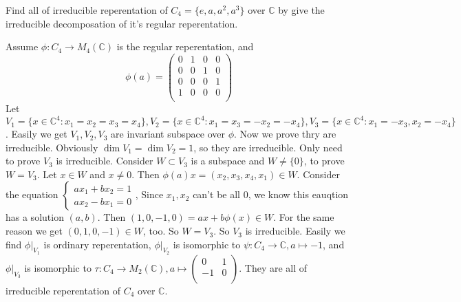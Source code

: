 \documentclass{ctexart}
\newif\ifpreface
\begin{document}
\large
\setlength{\baselineskip}{1.2em}
\ifpreface
    
\newgeometry{left=2cm,right=2cm,top=2cm,bottom=2cm}
\else
{}
\maketitle
\fi
\begin{problem}
  Find all of irreducible reperentation of \(C_4=\{e,a,a^2,a^3\}\) over \(\mathbb{C}\) by give the irreducible decomposation of it's regular reperentation. 
\end{problem}

\begin{solution}
  Assume \(\phi:C_4 \to M_4(\mathbb{C})\) is the regular reperentation, and
  \[
    \phi(a)=\left(\begin{array}{cccc}
      0 & 1 & 0 & 0 \\
      0 & 0 & 1 & 0 \\
      0 & 0 & 0 & 1 \\
      1 & 0 & 0 & 0 \\
    \end{array}\right)
  \]
  Let \(V_1=\{x \in \mathbb{C}^4:x_1=x_2=x_3=x_4\}, V_2=\{x \in \mathbb{C}^4:x_1=x_3=-x_2=-x_4\},V_3=\{x \in \mathbb{C}^4:x_1=-x_3,x_2=-x_4\}\). 
  Easily we get \(V_1,V_2,V_3\) are invariant subspace over \(\phi\). Now we prove thry are irreducible. 
  Obviously \(\dim V_1=\dim V_2=1\), so they are irreducible. Only need to prove \(V_3\) is irreducible. 
  Consider \(W \subset V_3\) is a subspace and \(W \neq \{0\}\), to prove \(W=V_3\). 
  Let \(x \in W\) and \(x \neq 0\). Then \(\phi(a)x=(x_2,x_3,x_4,x_1) \in W\). 
  Consider the equation \(\begin{cases}
    a x_1+b x_2=1 \\
    a x_2 - b x_1 =0
  \end{cases}\), Since \(x_1,x_2\) can't be all \(0\), we know this eauqtion has a solution \((a,b)\). 
  Then \((1,0,-1,0)=ax+b \phi(x) \in W\). For the same reason we get \((0,1,0,-1) \in W\), too. 
  So \(W=V_3\). So \(V_3\) is irreducible. 
  Easily we find \(\phi|_{V_1}\) is ordinary reperentation, 
  \(\phi|_{V_2}\) is isomorphic to \(\psi:C_4 \to \mathbb{C}, a \mapsto -1\), 
  and \(\phi|_{V_3}\) is isomorphic to \(\tau:C_4 \to M_2(\mathbb{C}), a \mapsto \begin{pmatrix}
    0 & 1 \\
    -1 & 0 \\
  \end{pmatrix}\). 
  They are all of irreducible reperentation of \(C_4\) over \(\mathbb{C}\). 
\end{solution}
\end{document}
